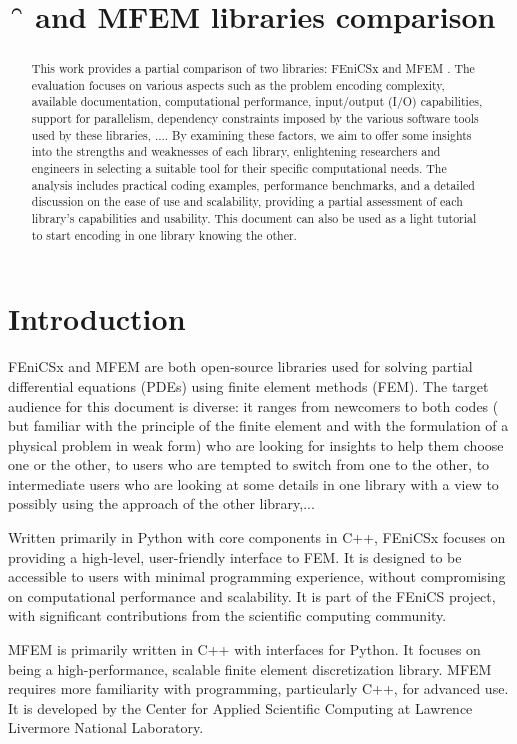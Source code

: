 \documentclass[12pt]{article}
\title{\f{} and MFEM libraries comparison  }
\newcommand{\f}[1]{FEniCSx#1}
\begin{document}
\maketitle

\begin{abstract} 	
	This work provides a partial comparison of two   libraries:  \f{} and MFEM . The evaluation focuses on various aspects such as the problem encoding complexity, available documentation, computational performance, input/output (I/O) capabilities, support for parallelism, dependency constraints imposed by the various software tools used by these libraries,  .... By examining these factors, we aim to offer some insights into the strengths and weaknesses of each library,  enlightening researchers and engineers in selecting a  suitable tool for their specific computational needs. The analysis includes practical coding examples, performance benchmarks, and a detailed discussion on the ease of use and scalability, providing a partial assessment of each library's capabilities and usability. This document can also be used as a light tutorial to start encoding in one library knowing the other.
\end{abstract}
\section{Introduction}
\f{} and MFEM are both open-source libraries used for solving partial differential equations (PDEs) using finite element methods (FEM).
The target audience for this document is diverse: it ranges from newcomers to both codes ( but familiar with the principle of the finite element and with the formulation of a physical problem in weak form)  who are looking for insights to help them choose one or the other, to users who are tempted to switch from one to the other, to intermediate users who are looking at some details in one library with a view to possibly using the approach of the other library,...

Written  primarily  in Python with core components in C++, \f{}  focuses on providing a high-level, user-friendly interface to FEM. It is designed to be accessible to users with minimal programming experience, without compromising on computational performance and scalability.
It is part of the FEniCS project, with significant contributions from the scientific computing community.

MFEM is primarily written in C++ with interfaces for Python. It focuses on being a high-performance, scalable finite element discretization library. MFEM requires more familiarity with programming, particularly C++, for advanced use. It is developed by the Center for Applied Scientific Computing at Lawrence Livermore National Laboratory. 
\end{document}
